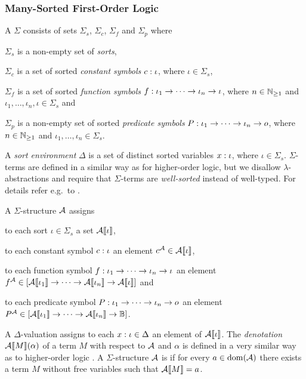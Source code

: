 \documentclass[a4paper,twoside,notitlepage,openright,11pt]{report}
\begin{document}
\subsubsection{Many-Sorted First-Order Logic}
A  $\Sigma$ consists of sets $\Sigma_s$, $\Sigma_c$, $\Sigma_f$ and $\Sigma_p$ where
\begin{enumerate*}
\item $\Sigma_s$ is a non-empty set of \emph{sorts},
\item $\Sigma_c$ is a set of sorted \emph{constant symbols} $c:\iota$, where $\iota\in\Sigma_s$,
\item $\Sigma_f$ is a set of sorted \emph{function symbols} $f:\iota_1\to\cdots\to\iota_n\to\iota$, where $n\in\mathbb N_{\geq 1}$ and $\iota_1,\ldots,\iota_n,\iota\in\Sigma_s$ and
\item $\Sigma_p$ is a non-empty set of sorted \emph{predicate symbols} $P:\iota_1\to\cdots\to\iota_n\to o$, where $n\in\mathbb N_{\geq 1}$ and $\iota_1,\ldots,\iota_n\in\Sigma_s$.
\end{enumerate*}
A \emph{sort environment} $\Delta$ is a set of distinct sorted variables $x:\iota$, where $\iota\in\Sigma_s$. $\Sigma$-terms are defined in a similar way as for higher-order logic, but we disallow $\lambda$-abstractions and require that $\Sigma$-terms are \emph{well-sorted} instead of well-typed. For details refer e.g.\ to \cite{K13}.

A $\Sigma$-structure $\mathcal A$ assigns 
\begin{enumerate*}
\item to each sort $\iota\in\Sigma_s$ a set ${\mathcal A}\llbracket\iota\rrbracket$,
\item to each constant symbol $c:\iota$ an element $c^\mathcal A\in{\mathcal A}\llbracket\iota\rrbracket$,
\item to each function symbol $f:\iota_1\to\cdots\to\iota_n\to\iota$ an element $f^\mathcal A\in[{\mathcal A}\llbracket\iota_1\rrbracket\to\cdots\to{\mathcal A}\llbracket\iota_n\rrbracket\to{\mathcal A}\llbracket\iota\rrbracket]$ and 
\item to each predicate symbol $P:\iota_1\to\cdots\to\iota_n\to o$ an element $P^\mathcal A\in[{\mathcal A}\llbracket\iota_1\rrbracket\to\cdots\to{\mathcal A}\llbracket\iota_n\rrbracket\to\mathbb B]$.
\end{enumerate*}
A $\Delta$-valuation assigns to each $x:\iota\in\Delta$ an element of ${\mathcal A}\llbracket\iota\rrbracket$.
The \emph{denotation ${\mathcal A}\llbracket M\rrbracket(\alpha)$} of a term $M$ with respect to $\mathcal A$ and $\alpha$ is defined in a very similar way as to higher-order logic \cite{K13}.
A $\Sigma$-structure $\mathcal A$ is  if for every $a\in\operatorname{dom}(\mathcal A)$ there exists a term $M$ without free variables such that ${\mathcal A}\llbracket M\rrbracket=a$. 
\end{document}

